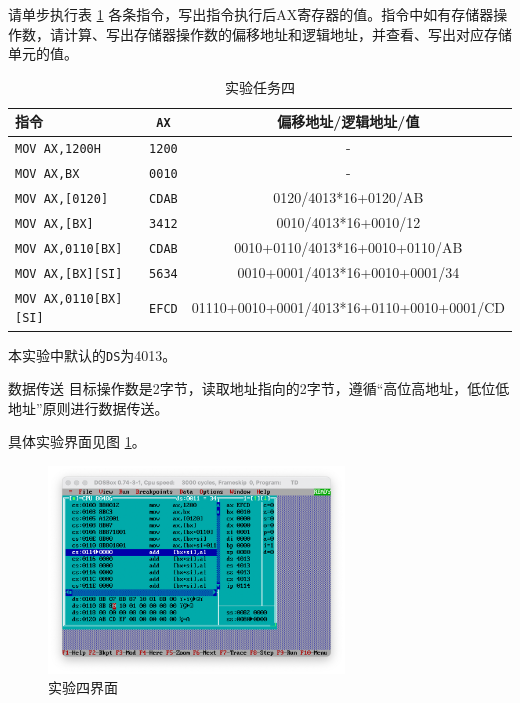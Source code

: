 \documentclass[11pt]{SEU-Digital-Report}
\newcommand{\grayrow}{\rowcolor[rgb]{ .906, .902, .902}}
\begin{document}
请单步执行表 \ref{tab:task4} 各条指令，写出指令执行后AX寄存器的值。指令中如有存储器操作数，请计算、写出存储器操作数的偏移地址和逻辑地址，并查看、写出对应存储单元的值。
\begin{table}[htbp]
    \centering
    \caption{实验任务四\label{tab:task4}}
    \bgroup{}
    \setlength{\tabcolsep}{4mm}
        \begin{threeparttable}
        \begin{tabular}{l|c|c}
          \toprule
            \textbf{指令} & \texttt{AX} & \textbf{偏移地址/逻辑地址/值}\\
          \midrule\midrule
            \grayrow \texttt{MOV AX,1200H} & \texttt{1200} & -\\
            \texttt{MOV AX,BX} & \texttt{0010} & -\\
            \grayrow \texttt{MOV AX,[0120]} & \texttt{CDAB} & 0120/4013*16+0120/AB \\
            \texttt{MOV AX,[BX]} & \texttt{3412} & 0010/4013*16+0010/12 \\
            \grayrow \texttt{MOV AX,0110[BX]} & \texttt{CDAB} & 0010+0110/4013*16+0010+0110/AB\\
            \texttt{MOV AX,[BX][SI]} & \texttt{5634} & 0010+0001/4013*16+0010+0001/34\\
            \grayrow \texttt{MOV AX,0110[BX][SI]} & \texttt{EFCD} & 01110+0010+0001/4013*16+0110+0010+0001/CD\\
          \bottomrule
        \end{tabular}

        \begin{tablenotes} %
        \footnotesize
        \item[1] 本实验中默认的\texttt{DS}为4013。
        \end{tablenotes} %
        \end{threeparttable} %

    \egroup
\end{table}

\begin{note}{数据传送}{}
    目标操作数是2字节，读取地址指向的2字节，遵循“高位高地址，低位低地址”原则进行数据传送。
\end{note}

具体实验界面见图 \ref{fig:task4}。
\begin{figure}[htbp]
    \centering
    \includegraphics[width=0.7\textwidth]{fig/task4.png}
    \caption{实验四界面}
    \label{fig:task4} 
\end{figure}
\end{document}
